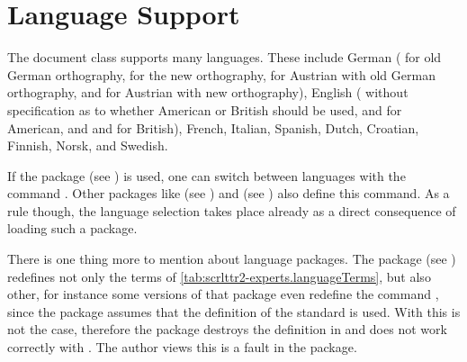 \section{Language Support}
\label{sec:scrlttr2-experts.languages}%
%

The document class  supports many languages.  These include
German ( for old German orthography,
 for the new orthography,  for Austrian with
old German orthography, and
 for Austrian with new
orthography), English ( without
specification as to whether American or British should be used,
 and  for American, and 
and  for British), French,
Italian, Spanish,
Dutch, Croatian,
Finnish,
Norsk, and
Swedish.

If the package  (see
\cite{package:babel}) is used, one can switch between languages with
the command .  Other
packages like  (see
\cite{package:german}) and 
(see \cite{package:ngerman}) also define this command.  As a rule
though, the language selection takes place already as a direct
consequence of loading such a package. 
\iffalse%
Further information can be obtained in the documentation of the relevant
packages.
\fi

There is one thing more to mention about language
packages.  The package
 (see
\cite{package:french}) redefines not only the terms of
\autoref{tab:scrlttr2-experts.languageTerms}, but also other, for instance
some versions of that package even redefine the command , since
the package assumes that the definition of the standard  is
used.  With  this is not the case, therefore the package
 destroys the definition in  and does not work
correctly with \KOMAScript. The author views this is a fault in the
 package.

